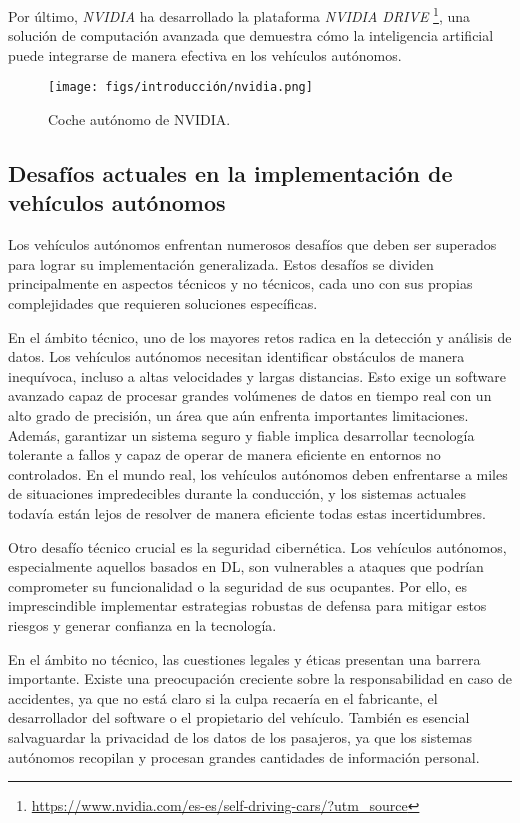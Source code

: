 Por último, \textit{NVIDIA} ha desarrollado la plataforma \textit{NVIDIA DRIVE} \footnote{\url{https://www.nvidia.com/es-es/self-driving-cars/?utm_source}}, una solución de computación avanzada que demuestra cómo la inteligencia artificial puede integrarse de manera efectiva en los vehículos autónomos.

\begin{figure}[ht]
  \begin{center}
    \texttt{[image: figs/introducción/nvidia.png]}
  \end{center}
  \caption{Coche autónomo de NVIDIA.}
  \label{nvidia}
\end{figure}

\subsection{Desafíos actuales en la implementación de vehículos autónomos}
\label{sec:desafíos}

Los vehículos autónomos enfrentan numerosos desafíos que deben ser superados para lograr su implementación generalizada. Estos desafíos se dividen principalmente en aspectos técnicos y no técnicos, cada uno con sus propias complejidades que requieren soluciones específicas.

En el ámbito técnico, uno de los mayores retos radica en la detección y análisis de datos. Los vehículos autónomos necesitan identificar obstáculos de manera inequívoca, incluso a altas velocidades y largas distancias. Esto exige un software avanzado capaz de procesar grandes volúmenes de datos en tiempo real con un alto grado de precisión, un área que aún enfrenta importantes limitaciones. Además, garantizar un sistema seguro y fiable implica desarrollar tecnología tolerante a fallos y capaz de operar de manera eficiente en entornos no controlados. En el mundo real, los vehículos autónomos deben enfrentarse a miles de situaciones impredecibles durante la conducción, y los sistemas actuales todavía están lejos de resolver de manera eficiente todas estas incertidumbres.

Otro desafío técnico crucial es la seguridad cibernética. Los vehículos autónomos, especialmente aquellos basados en \ac{DL}, son vulnerables a ataques que podrían comprometer su funcionalidad o la seguridad de sus ocupantes. Por ello, es imprescindible implementar estrategias robustas de defensa para mitigar estos riesgos y generar confianza en la tecnología.

En el ámbito no técnico, las cuestiones legales y éticas presentan una barrera importante. Existe una preocupación creciente sobre la responsabilidad en caso de accidentes, ya que no está claro si la culpa recaería en el fabricante, el desarrollador del software o el propietario del vehículo. También es esencial salvaguardar la privacidad de los datos de los pasajeros, ya que los sistemas autónomos recopilan y procesan grandes cantidades de información personal.

